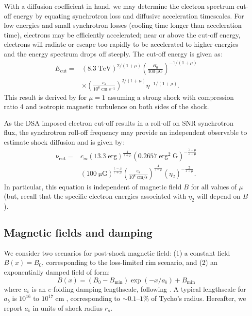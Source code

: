 \documentclass[iop, apj, numberedappendix]{emulateapj}
\newcommand*{\mt}{\mathrm}
\newcommand*{\unit}[1]{\;\mt{#1}}  %
\newcommand*{\abt}{\mathord{\sim}} %
\newcommand*{\Ecut}{E_{\mt{cut}}}
\newcommand*{\muG}{\unit{\mu G}}
\begin{document}
With a diffusion coefficient in hand, we may determine the electron spectrum
cut-off energy by equating synchrotron loss and diffusive acceleration
timescales.  For low energies and small synchrotron losses (cooling time longer
than acceleration time), electrons may be efficiently accelerated; near or
above the cut-off energy, electrons will radiate or escape too rapidly to be
accelerated to higher energies and the energy spectrum drops off steeply.  The
cut-off energy is given as:
\begin{align} \label{eq:ecut}
    \Ecut =
        &\left(8.3\unit{TeV}\right)^{2/(1+\mu)}
        \left(\frac{B_0}{100 \muG}\right)^{-1/(1+\mu)} \nonumber \\
        &\times \left(\frac{v_s}{10^8 \unit{cm\;s^{-1}}}\right)^{2/(1+\mu)}
        \eta^{-1 / (1+\mu)} .
\end{align}
This result is derived by \citet{parizot2006} for $\mu=1$ assuming a strong
shock with compression ratio 4 and isotropic magnetic turbulence on both sides
of the shock.

As the DSA imposed electron cut-off results in a roll-off on SNR synchrotron
flux, the synchrotron roll-off frequency may provide an independent observable
to estimate shock diffusion and is given by:
\begin{align} \label{eq:rolloff}
    \nu_{\mt{cut}} =
        &c_m \left(13.3 \unit{erg}\right)^{\frac{4}{1+\mu}}
        \left(0.2657 \unit{erg^2\;G}\right)^{-\frac{1-\mu}{1+\mu}} \nonumber \\
        &\left( 100 \muG \right)^{\frac{1-\mu}{1+\mu}}
        \left( \frac{v_s}{10^8 \unit{cm/s}} \right)^{\frac{4}{1+\mu}}
        \left( \eta_2 \right)^{-\frac{2}{1+\mu}} .
\end{align}
In particular, this equation is independent of magnetic field $B$ for all
values of $\mu$ (but, recall that the specific electron energies associated
with $\eta_2$ will depend on $B$).

\subsection{Magnetic fields and damping}

We consider two scenarios for post-shock magnetic field: (1) a constant field
$B(x) = B_0$, corresponding to the loss-limited rim scenario, and (2) an
exponentially damped field of form:
\begin{equation} \label{eq:bdamp}
    B(x) = \left(B_0 - B_{\mt{min}}\right) \exp\left(-x / a_b\right)
           + B_{\mt{min}}
\end{equation}
where $a_b$ is an $e$-folding damping lengthscale, following \citet{pohl2005}.
A typical lengthscale for $a_b$ is $10^{16}$ to $10^{17} \unit{cm}$
\citep{pohl2005}, corresponding to $\abt 0.1$--$1\%$ of Tycho's radius.
Hereafter, we report $a_b$ in units of shock radius $r_s$.
\end{document}
